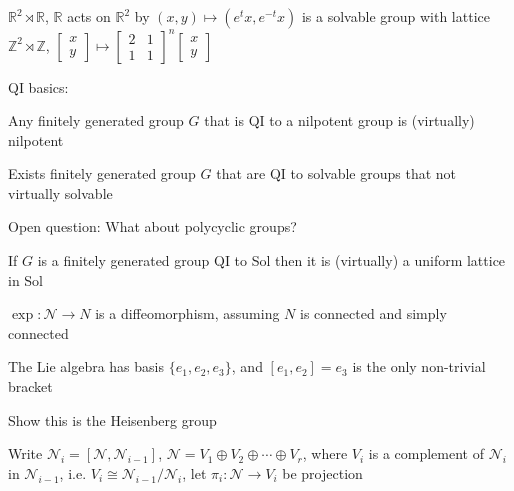 \documentclass[main]{subfiles}
\begin{document}
\begin{example}[Sol]
$\mathbb R^2\rtimes\mathbb R$, $\mathbb R$ acts on $\mathbb R^2$ by $(x,y)\mapsto(e^tx,e^{-t}x)$ is a solvable group with lattice $\mathbb Z^2\rtimes\mathbb Z$, $\begin{bmatrix}
x\\
y
\end{bmatrix}\mapsto\begin{bmatrix}
2&1\\
1&1
\end{bmatrix}^n\begin{bmatrix}
x\\
y
\end{bmatrix}$
\end{example}

QI basics:

\begin{theorem}[Gromov]
Any finitely generated group $G$ that is QI to a nilpotent group is (virtually) nilpotent
\end{theorem}

\begin{note}[Ershler]
Exists finitely generated group $G$ that are QI to solvable groups that not virtually solvable
\end{note}

Open question: What about polycyclic groups?

\begin{theorem}
If $G$ is a finitely generated group QI to Sol then it is (virtually) a uniform lattice in Sol
\end{theorem}

\begin{fact}
$\exp:\mathscr N\to N$ is a diffeomorphism, assuming $N$ is connected and simply connected
\end{fact}

\begin{example}
The Lie algebra has basis $\{e_1,e_2,e_3\}$, and $[e_1,e_2]=e_3$ is the only non-trivial bracket
\end{example}

\begin{exercise}
Show this is the Heisenberg group
\end{exercise}

Write $\mathscr N_i=[\mathscr N,\mathscr N_{i-1}]$, $\mathscr N=V_1\oplus V_2\oplus\cdots\oplus V_r$, where $V_i$ is a complement of $\mathscr N_i$ in $\mathscr N_{i-1}$, i.e. $V_i\cong\mathscr N_{i-1}/\mathscr N_{i}$, let $\pi_i:\mathscr N\to V_i$ be projection
\end{document}
